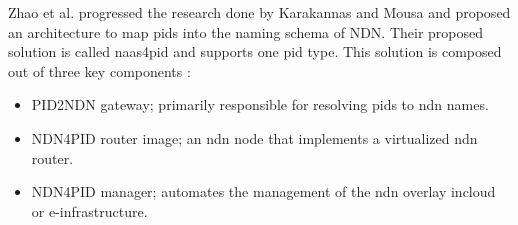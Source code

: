 Zhao et al. progressed the research done by Karakannas \cite{icn-bd} and Mousa \cite{ndn-app-aware} and proposed an architecture to map \glspl{pid} into the naming schema of NDN. Their proposed solution is called \gls{naas4pid} and supports one \gls{pid} type. This solution is composed out of three key components \cite{koulouzis2018information}:
\begin{itemize}
  \item PID2NDN gateway; primarily responsible for resolving \glspl{pid} to \gls{ndn} names.
  \item NDN4PID router image; an \gls{ndn} node that implements a virtualized \gls{ndn} router.
  \item NDN4PID manager; automates the management of the \gls{ndn} overlay in\newline cloud or e-infrastructure.
\end{itemize}

